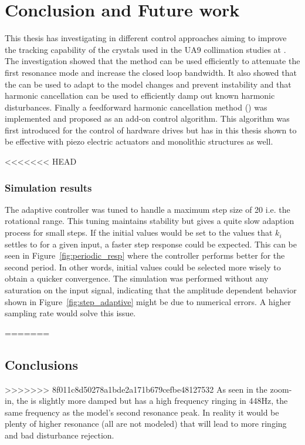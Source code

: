 \chapter{Conclusion and Future work}\label{cha:conclusion}
This thesis has investigating in different control approaches aiming to improve the tracking capability of the crystals used in the UA9 collimation studies at \abbrCERN. The investigation showed that the \abbrIRC method can be used efficiently to attenuate the first resonance mode and increase the closed loop bandwidth. It also showed that the \abbrMRACPE can be used to adapt to the model changes and prevent instability and that harmonic cancellation can be used to efficiently damp out known harmonic disturbances. Finally a feedforward harmonic cancellation method (\abbrRFDC) was implemented and proposed as an add-on control algorithm. This algorithm was first introduced for the control of hardware drives but has in this thesis shown to be effective with piezo electric actuators and monolithic structures as well.

<<<<<<< HEAD

\subsection{Simulation results}
The adaptive controller was tuned to handle a maximum step size of \unit{20}{\milli\radian} i.e. the rotational range. This tuning maintains stability but gives a quite slow adaption process for small steps. If the initial values would be set to the values that $k_i$ settles to for a given input, a faster step response could be expected. This can be seen in Figure~\ref{fig:periodic_resp} where the controller performs better for the second period. In other words, initial values could be selected more wisely to obtain a quicker convergence.  The simulation was performed without any saturation on the input signal, indicating that the amplitude dependent behavior shown in Figure~\ref{fig:step_adaptive} might be due to numerical errors. A higher sampling rate would solve this issue. 



=======
\section{Conclusions}
>>>>>>> 8f011c8d50278a1bde2a171b679cefbe48127532
As seen in the zoom-in, the \abbrIRC is slightly more damped but has a high frequency ringing in 448Hz, the same frequency as the model's second resonance peak. In reality it would be plenty of  higher resonance (all are not modeled) that will lead to more ringing and bad disturbance rejection.

